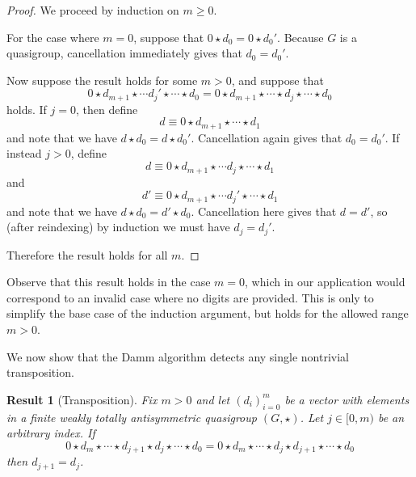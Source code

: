 \documentclass{article}
\theoremstyle{plain}
\newtheorem{result}{Result}[section]
\theoremstyle{definition}
\begin{document}
\begin{proof}
	We proceed by induction on $m \geq 0$.

	For the case where $m = 0$, suppose that $0 \star d_0 = 0 \star d_0'$.
	Because $G$ is a quasigroup, cancellation immediately gives that $d_0 = d_0'$.

	Now suppose the result holds for some $m > 0$, and suppose that
	\[ 0 \star d_{m+1} \star \cdots d_j' \star \cdots \star d_0 = 0 \star d_{m+1} \star \cdots \star d_j \star \cdots \star d_0 \]
	holds.
	If $j = 0$, then define
	\[ d \equiv 0 \star d_{m+1} \star \cdots \star d_1 \]
	and note that we have $d \star d_0 = d \star d_0'$.
	Cancellation again gives that $d_0 = d_0'$.
	If instead $j > 0$, define
	\[ d \equiv 0 \star d_{m+1} \star \cdots d_j \star \cdots \star d_1 \]
	and
	\[ d' \equiv 0 \star d_{m+1} \star \cdots d_j' \star \cdots \star d_1 \]
	and note that we have $d \star d_0 = d' \star d_0$.
	Cancellation here gives that $d = d'$, so (after reindexing) by induction we must have $d_j = d_j'$.

	Therefore the result holds for all $m$.
\end{proof}
Observe that this result holds in the case $m = 0$, which in our application would correspond to an invalid case where no digits are provided.
This is only to simplify the base case of the induction argument, but holds for the allowed range $m > 0$.

We now show that the Damm algorithm detects any single nontrivial transposition.
\begin{result}[Transposition]
	\label{result:transposition}
	Fix $m > 0$ and let $(d_i)_{i=0}^m$ be a vector with elements in a finite weakly totally antisymmetric quasigroup $(G, \star)$.
	Let $j \in [0, m)$ be an arbitrary index.
	If
	\[ 0 \star d_m \star \cdots \star d_{j+1} \star d_j \star \cdots \star d_0 = 0 \star d_m \star \cdots \star d_j \star d_{j+1} \star \cdots \star d_0 \]
	then $d_{j+1} = d_j$.
\end{result}
\end{document}
